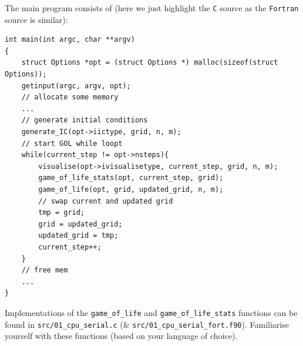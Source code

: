 The main program consists of (here we just highlight the \texttt{C} source as the \texttt{Fortran} source is similar): 
\begin{center}
\begin{minipage}{0.95\textwidth}
\begin{verbatim}
int main(int argc, char **argv)
{
    struct Options *opt = (struct Options *) malloc(sizeof(struct Options));
    getinput(argc, argv, opt);
    // allocate some memory 
    ... 
    // generate initial conditions 
    generate_IC(opt->iictype, grid, n, m);
    // start GOL while loopt 
    while(current_step != opt->nsteps){
        visualise(opt->ivisualisetype, current_step, grid, n, m);
        game_of_life_stats(opt, current_step, grid);
        game_of_life(opt, grid, updated_grid, n, m);
        // swap current and updated grid
        tmp = grid;
        grid = updated_grid;
        updated_grid = tmp;
        current_step++;
    }
    // free mem
    ...
}
\end{verbatim}

\end{minipage}
\end{center}
Implementations of the {\color{blue}\texttt{game\_of\_life}} and {\color{blue}\texttt{game\_of\_life\_stats}} functions can be found in \texttt{src/01\_cpu\_serial.c} (\& \texttt{src/01\_cpu\_serial\_fort.f90}). Familiarise yourself with these functions (based on your language of choice).  

